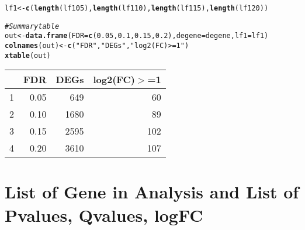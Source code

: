 \documentclass{article}\usepackage[]{graphicx}\usepackage[]{color}
\makeatletter
\newcommand{\hlnum}[1]{\textcolor[rgb]{0.686,0.059,0.569}{#1}}%
\newcommand{\hlstr}[1]{\textcolor[rgb]{0.192,0.494,0.8}{#1}}%
\newcommand{\hlcom}[1]{\textcolor[rgb]{0.678,0.584,0.686}{\textit{#1}}}%
\newcommand{\hlstd}[1]{\textcolor[rgb]{0.345,0.345,0.345}{#1}}%
\newcommand{\hlkwb}[1]{\textcolor[rgb]{0.69,0.353,0.396}{#1}}%
\newcommand{\hlkwc}[1]{\textcolor[rgb]{0.333,0.667,0.333}{#1}}%
\newcommand{\hlkwd}[1]{\textcolor[rgb]{0.737,0.353,0.396}{\textbf{#1}}}%
\newenvironment{kframe}{%
 \def\at@end@of@kframe{}%
 \ifinner\ifhmode%
  \def\at@end@of@kframe{\end{minipage}}%
  \begin{minipage}{\columnwidth}%
 \fi\fi%
 \def\FrameCommand##1{\hskip\@totalleftmargin \hskip-\fboxsep
 \colorbox{shadecolor}{##1}\hskip-\fboxsep
     \hskip-\linewidth \hskip-\@totalleftmargin \hskip\columnwidth}%
 \MakeFramed {\advance\hsize-\width
   \@totalleftmargin\z@ \linewidth\hsize
   \@setminipage}}%
 {\par\unskip\endMakeFramed%
 \at@end@of@kframe}
\newenvironment{knitrout}{}{} %
\makeatother
\begin{document}
\begin{knitrout}
\begin{kframe}
\begin{alltt}
\hlstd{lf1} \hlkwb{<-} \hlkwd{c}\hlstd{(}\hlkwd{length}\hlstd{(lf105),} \hlkwd{length}\hlstd{(lf110),} \hlkwd{length}\hlstd{(lf115),} \hlkwd{length}\hlstd{(lf120))}
\end{alltt}
\end{kframe}
\end{knitrout}




\begin{kframe}
\begin{alltt}
\hlcom{# Summary table}
\hlstd{out} \hlkwb{<-} \hlkwd{data.frame}\hlstd{(}\hlkwc{FDR} \hlstd{=} \hlkwd{c}\hlstd{(}\hlnum{0.05}\hlstd{,} \hlnum{0.1}\hlstd{,} \hlnum{0.15}\hlstd{,} \hlnum{0.2}\hlstd{),} \hlkwc{degene} \hlstd{= degene,} \hlkwc{lf1} \hlstd{= lf1)}
\hlkwd{colnames}\hlstd{(out)} \hlkwb{<-} \hlkwd{c}\hlstd{(}\hlstr{"FDR"}\hlstd{,} \hlstr{"DEGs"}\hlstd{,} \hlstr{"log2(FC)>=1"}\hlstd{)}
\hlkwd{xtable}\hlstd{(out)}
\end{alltt}
\end{kframe}%
\begin{table}[ht]
\centering
\begin{tabular}{rrrr}
  \hline
 & FDR & DEGs & log2(FC)$>$=1 \\ 
  \hline
1 & 0.05 & 649 &  60 \\ 
  2 & 0.10 & 1680 &  89 \\ 
  3 & 0.15 & 2595 & 102 \\ 
  4 & 0.20 & 3610 & 107 \\ 
   \hline
\end{tabular}
\end{table}



\section{List of Gene in Analysis and List of Pvalues, Qvalues, logFC}
\end{document}
